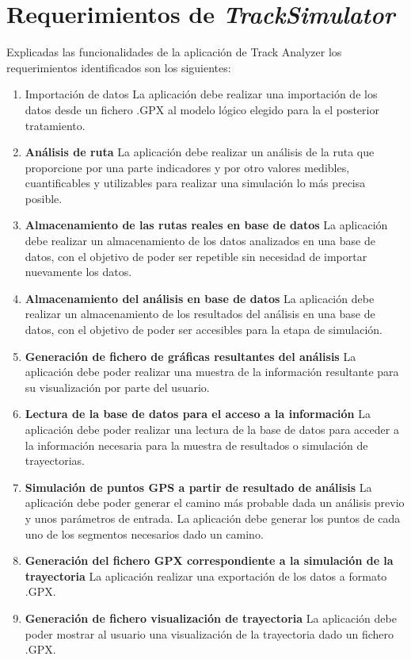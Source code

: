 \section{Requerimientos de \textit{TrackSimulator}} \label{section: RequerimientosTrackSimulator}
Explicadas las funcionalidades de la aplicación de Track Analyzer los requerimientos identificados son los siguientes:
\begin{enumerate}[label={R.\arabic*.}]

\item Importación de datos La aplicación debe realizar una importación de los datos desde un fichero .\ac{GPX} al modelo lógico elegido para la el posterior tratamiento.

\item \textbf{Análisis de ruta} La aplicación debe realizar un análisis de la ruta que proporcione por una parte indicadores y por otro valores medibles, cuantificables y utilizables para realizar una simulación 
lo más precisa posible.

\item \textbf{Almacenamiento de las rutas reales en base de datos} La aplicación debe realizar un almacenamiento de los datos analizados en una base de datos, con el objetivo de poder ser repetible
sin necesidad de importar nuevamente los datos.

\item \textbf{Almacenamiento del análisis en base de datos} La aplicación debe realizar un almacenamiento de los resultados del análisis en una base de datos, con el objetivo de poder ser accesibles para la
etapa de simulación.

\item \textbf{Generación de fichero de gráficas resultantes del análisis}  La aplicación debe poder realizar una muestra de la información resultante para su visualización por parte del usuario.

\item \textbf{Lectura de la base de datos para el acceso a la información} La aplicación debe poder realizar una lectura de la base de datos para acceder a la información necesaria para la muestra de resultados o 
simulación de trayectorias.

\item \textbf{Simulación de puntos \ac{GPS} a partir de resultado de análisis} La aplicación debe poder generar el camino más probable dada un análisis previo y unos parámetros de entrada. La aplicación debe generar los puntos de cada uno de los segmentos necesarios dado un camino.

\item \textbf{Generación del fichero GPX correspondiente a la simulación de la trayectoria}  La aplicación realizar una exportación de los datos a formato .\ac{GPX}.

\item \textbf{Generación de fichero visualización de trayectoria}  La aplicación debe poder mostrar al usuario una visualización de la trayectoria dado un fichero .\ac{GPX}.

\end{enumerate}

